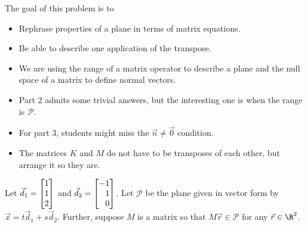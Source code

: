 	\bookonlynewpage
	\question
	\begin{annotation}
		\begin{goals}

			The goal of this problem is to
			\begin{itemize}
				\item Rephrase properties of a plane in terms of matrix equations.
				\item Be able to describe one application of the transpose.
			\end{itemize}
		\end{goals}

		\begin{notes}
			\begin{itemize}
				\item We are using the range of a matrix operator to describe a plane and the
					null space of a matrix to define normal vectors.
				\item Part 2 admits some trivial answers, but the interesting one is when 
					the range is $\mathcal P$.
				\item For part 3, students might miss the $\vec n\neq \vec 0$ condition.
				\item The matrices $K$ and $M$ do not have to be transposes of each other,
					but arrange it so they are.
			\end{itemize}
		\end{notes}
	\end{annotation}
	Let $\vec d_1=\mat{1\\1\\2}$ and $\vec d_2=\mat{-1\\1\\0}$.
	Let $\mathcal P$ be the plane given in vector form by $\vec x=t\vec d_1+s\vec d_2$.
	Further, suppose $M$ is a matrix so that $M\vec r\in\mathcal P$ for any $\vec r\in\R^2$.
